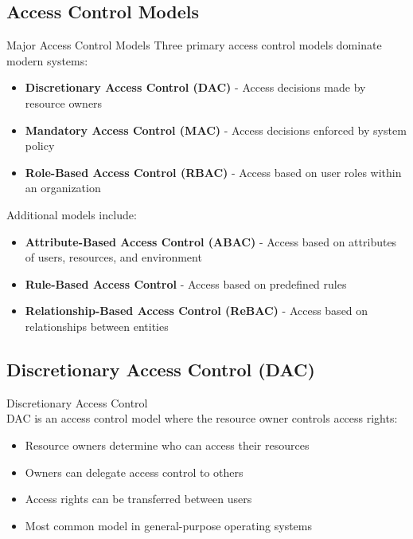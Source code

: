 \subsection{Access Control Models}

\begin{concept}{Major Access Control Models}
Three primary access control models dominate modern systems:
\begin{itemize}
    \item \textbf{Discretionary Access Control (DAC)} - Access decisions made by resource owners
    \item \textbf{Mandatory Access Control (MAC)} - Access decisions enforced by system policy
    \item \textbf{Role-Based Access Control (RBAC)} - Access based on user roles within an organization
\end{itemize}
Additional models include:
\begin{itemize}
    \item \textbf{Attribute-Based Access Control (ABAC)} - Access based on attributes of users, resources, and environment
    \item \textbf{Rule-Based Access Control} - Access based on predefined rules
    \item \textbf{Relationship-Based Access Control (ReBAC)} - Access based on relationships between entities
\end{itemize}
\end{concept}

\subsection{Discretionary Access Control (DAC)}

\begin{definition}{Discretionary Access Control}\\
DAC is an access control model where the resource owner controls access rights:
\begin{itemize}
    \item Resource owners determine who can access their resources
    \item Owners can delegate access control to others
    \item Access rights can be transferred between users
    \item Most common model in general-purpose operating systems
\end{itemize}
\end{definition}

